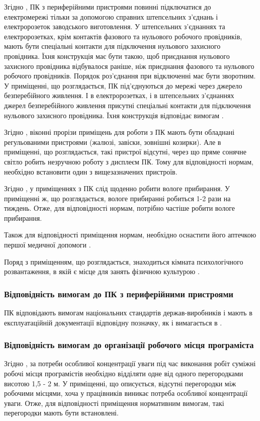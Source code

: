 \documentclass[a4paper,12pt]{article}
\begin{document}
Згідно \cite{npaop1210}, ПК з периферійними пристроями повинні підключатися до електромережі тільки за допомогою справних штепсельних з'єднань і електророзеток заводського виготовлення. У штепсельних з'єднаннях та електророзетках, крім контактів фазового та нульового робочого провідників, мають бути спеціальні контакти для підключення нульового захисного провідника. Їхня конструкція має бути такою, щоб приєднання нульового захисного провідника відбувалося раніше, ніж приєднання фазового та нульового робочого провідників. Порядок роз'єднання при відключенні має бути зворотним. У приміщенні, що розглядається, ПК під’єднуються до мережі через джерело безперебійного живлення. І в електророзетках, і в штепсельних з’єднаннях джерел безперебійного живлення присутні спеціальні контакти для підключення нульового захисного провідника. Їхня конструкція відповідає вимогам \cite{npaop1210}.

Згідно \cite{sanpin798}, віконні прорізи приміщень для роботи з ПК мають бути обладнані регульованими пристроями (жалюзі, завіски, зовнішні козирки). Але в приміщенні, що розглядається, такі пристрої відсутні, через що пряме сонячне світло робить незручною роботу з дисплеєм ПК. Тому для відповідності нормам, необхідно встановити один з вищезазначених пристроїв.

Згідно \cite{sanpin798}, у приміщеннях з ПК слід щоденно робити вологе прибирання. У приміщенні ж, що розглядається, вологе прибиранні робиться 1-2 рази на тиждень. Отже, для відповідності нормам, потрібно частіше робити вологе прибирання.

Також для відповідності приміщення нормам, необхідно оснастити його аптечкою першої медичної допомоги \cite{sanpin798}.

Поряд з приміщенням, що розглядається, знаходиться кімната психологічного розвантаження, в якій є місце для занять фізичною культурою \cite{snip}.

\subsubsection{Відповідність вимогам до ПК з периферійними пристроями}
ПК відповідають вимогам національних стандартів держав-виробників і мають в експлуатаційній документації відповідну позначку, як і вимагається в \cite{npaop1210}.

\subsubsection{Відповідність вимогам до організації робочого місця програміста}
Згідно \cite{npaop1210}, за потреби особливої концентрації уваги під час виконання робіт суміжні робочі місця програмістів необхідно відділяти одне від одного перегородками висотою 1,5 - 2 м. У приміщенні, що описується, відсутні перегородки між робочими місцями, хоча у працівників виникає потреба особливої концентрації уваги. Отже, для відповідності приміщення нормативним вимогам, такі перегородки мають бути встановлені.
\end{document}
